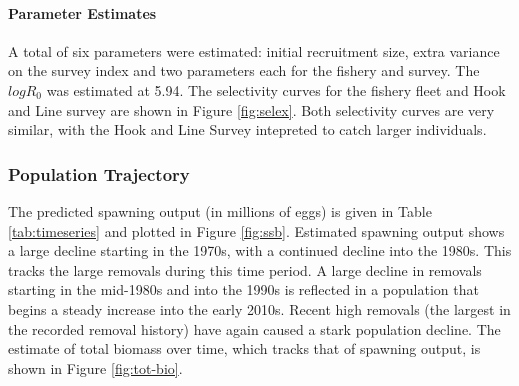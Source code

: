 \documentclass[11pt,
  english,
  a4paper,
]{article}
\begin{document}
\leavevmode\tagmcend\tagstructend\par


\hypertarget{parameter-estimates}{%
\paragraph{Parameter Estimates}\label{parameter-estimates}}

\leavevmode\tagmcend\tagstructend


A total of six parameters were estimated: initial recruitment size, extra variance on the survey index and two parameters each for the fishery and survey. The {\(logR_0\)\leavevmode\tagmcend\tagstructend} was estimated at 5.94. The selectivity curves for the fishery fleet and Hook and Line survey are shown in Figure \ref{fig:selex}. Both selectivity curves are very similar, with the Hook and Line Survey intepreted to catch larger individuals.

\leavevmode\tagmcend\tagstructend\par


\hypertarget{population-trajectory}{%
\subsubsection{Population Trajectory}\label{population-trajectory}}

\leavevmode\tagmcend\tagstructend


The predicted spawning output (in millions of eggs) is given in Table \ref{tab:timeseries} and plotted in Figure \ref{fig:ssb}. Estimated spawning output shows a large decline starting in the 1970s, with a continued decline into the 1980s. This tracks the large removals during this time period. A large decline in removals starting in the mid-1980s and into the 1990s is reflected in a population that begins a steady increase into the early 2010s. Recent high removals (the largest in the recorded removal history) have again caused a stark population decline. The estimate of total biomass over time, which tracks that of spawning output, is shown in Figure \ref{fig:tot-bio}.

\leavevmode\tagmcend\tagstructend\par
\end{document}
